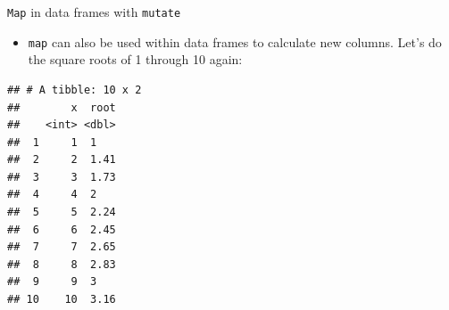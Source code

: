 \documentclass[
  ignorenonframetext,
]{beamer}
\newenvironment{Shaded}{\begin{snugshade}}{\end{snugshade}}
\newcommand{\DataTypeTok}[1]{\textcolor[rgb]{0.13,0.29,0.53}{#1}}
\newcommand{\DecValTok}[1]{\textcolor[rgb]{0.00,0.00,0.81}{#1}}
\newcommand{\KeywordTok}[1]{\textcolor[rgb]{0.13,0.29,0.53}{\textbf{#1}}}
\newcommand{\NormalTok}[1]{#1}
\newcommand{\OperatorTok}[1]{\textcolor[rgb]{0.81,0.36,0.00}{\textbf{#1}}}
\newcommand{\StringTok}[1]{\textcolor[rgb]{0.31,0.60,0.02}{#1}}
\providecommand{\tightlist}{%
  \setlength{\itemsep}{0pt}\setlength{\parskip}{0pt}}
\begin{document}
\begin{frame}[fragile]{\texttt{Map} in data frames with \texttt{mutate}}
\protect\hypertarget{map-in-data-frames-with-mutate}{}

\begin{itemize}
\tightlist
\item
  \texttt{map} can also be used within data frames to calculate new
  columns. Let's do the square roots of 1 through 10 again:
\end{itemize}

\begin{Shaded}
\end{Shaded}

\begin{verbatim}
## # A tibble: 10 x 2
##        x  root
##    <int> <dbl>
##  1     1  1   
##  2     2  1.41
##  3     3  1.73
##  4     4  2   
##  5     5  2.24
##  6     6  2.45
##  7     7  2.65
##  8     8  2.83
##  9     9  3   
## 10    10  3.16
\end{verbatim}

\end{frame}
\end{document}

